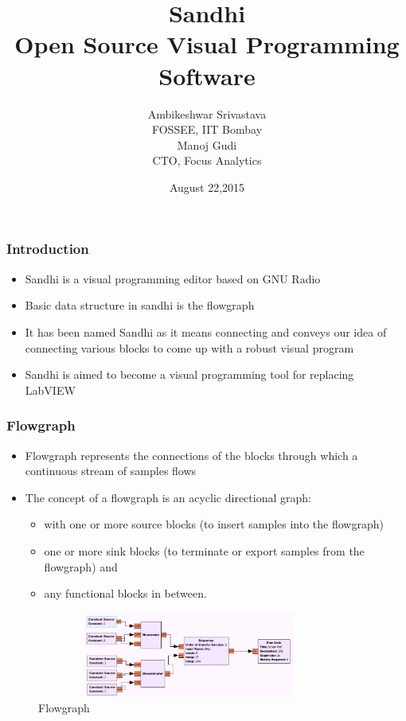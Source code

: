 \documentclass{beamer}
\title[Sandhi
\insertframenumber/\inserttotalframenumber]{Sandhi\\ Open Source Visual Programming Software}
\author[Sandhi Team, IIT Bombay]{Ambikeshwar Srivastava \\FOSSEE, IIT Bombay \\Manoj Gudi\\ CTO, Focus Analytics}
\date{August 22,2015}
\begin{document}
\begin{frame}
\titlepage
\end{frame}

\begin{frame}
	\frametitle{Introduction}
	\begin{itemize}
		\item Sandhi is a visual programming editor based on GNU Radio
		\item Basic data structure in sandhi is the flowgraph
		\item It has been named Sandhi as it means connecting and conveys our idea of connecting various blocks to come up with a robust visual program
		\item Sandhi is aimed to become a visual programming tool for replacing LabVIEW
	\end{itemize}
\end{frame}

\begin{frame}
        \frametitle{Flowgraph}
        \begin{itemize}
        \item Flowgraph represents the connections of the blocks through which a continuous stream of samples flows
        \item The concept of a flowgraph is an acyclic directional graph:
	\begin{itemize}
	\item  with one or more source blocks (to insert samples into the flowgraph) 
	\item  one or more sink blocks (to terminate or export samples from the flowgraph) and 
	\item  any functional blocks in between.
	\end {itemize}
        \end{itemize}
	\vspace{-0.14in}
        \begin{figure}
        \centering
        \includegraphics[height=2.8cm, width=10cm]{step_resp.png}
	\caption{Flowgraph}
        \end{figure}
        \vspace{-0.2in}

\end{frame}
\end{document}
